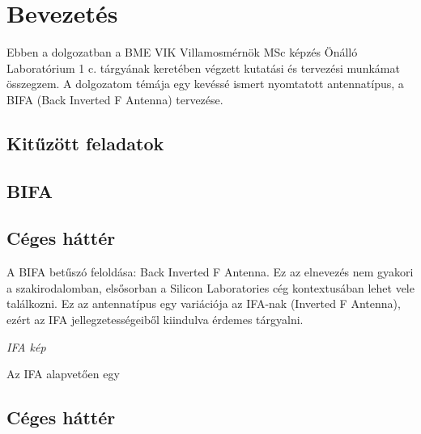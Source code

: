 \chapter{Bevezetés}
Ebben a dolgozatban a BME VIK Villamosmérnök MSc képzés Önálló Laboratórium 1 c. tárgyának keretében végzett kutatási és tervezési munkámat összegzem. A dolgozatom témája egy kevéssé ismert nyomtatott antennatípus, a BIFA (Back Inverted F Antenna) tervezése.
\section{Kitűzött feladatok}
\section{BIFA}
\section{Céges háttér}
A BIFA betűszó feloldása: Back Inverted F Antenna. Ez az elnevezés nem gyakori a szakirodalomban, elsősorban a Silicon Laboratories cég kontextusában lehet vele találkozni. Ez az antennatípus egy variációja az IFA-nak (Inverted F Antenna), ezért az IFA jellegzetességeiből kiindulva érdemes tárgyalni.
\par
\begin{center}
\textit{IFA kép}
\end{center}
\par
Az IFA alapvetően egy 
\section{Céges háttér}
